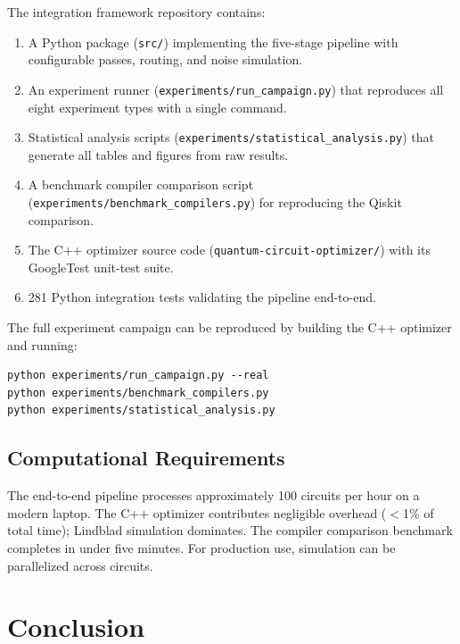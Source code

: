 \documentclass[sigconf,nonacm]{acmart}
\begin{document}
\noindent The integration framework repository contains:

\begin{enumerate}
    \item A Python package (\texttt{src/}) implementing the five-stage pipeline with configurable passes, routing, and noise simulation.
    \item An experiment runner (\texttt{experiments/\allowbreak run\_\allowbreak campaign.py}) that reproduces all eight experiment types with a single command.
    \item Statistical analysis scripts (\texttt{experiments/\allowbreak statistical\_\allowbreak analysis.py}) that generate all tables and figures from raw results.
    \item A benchmark compiler comparison script (\texttt{experiments/\allowbreak benchmark\_\allowbreak compilers.py}) for reproducing the Qiskit comparison.
    \item The C++ optimizer source code (\texttt{quantum-circuit-optimizer/}) with its GoogleTest unit-test suite.
    \item 281 Python integration tests validating the pipeline end-to-end.
\end{enumerate}

The full experiment campaign can be reproduced by building the C++ optimizer and running:
\begin{verbatim}
python experiments/run_campaign.py --real
python experiments/benchmark_compilers.py
python experiments/statistical_analysis.py
\end{verbatim}

\subsection{Computational Requirements}

The end-to-end pipeline processes approximately 100 circuits per hour on a modern laptop. The C++ optimizer contributes negligible overhead ($<$1\% of total time); Lindblad simulation dominates. The compiler comparison benchmark completes in under five minutes. For production use, simulation can be parallelized across circuits.

\section{Conclusion}
\label{sec:conclusion}
\end{document}
